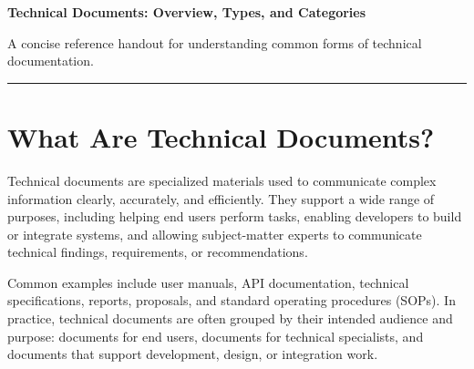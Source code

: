 \documentclass[11pt]{article}
\begin{document}
{\Large\bfseries\color{titlecolor} Technical Documents: Overview, Types, and Categories}\par
\vspace{0.35em}
{\normalsize A concise reference handout for understanding common forms of technical documentation.}\par
\vspace{0.8em}
\noindent\color{rulecolor}\rule{\textwidth}{1pt}

\section{What Are Technical Documents?}
Technical documents are specialized materials used to communicate complex information clearly, accurately, and efficiently. They support a wide range of purposes, including helping end users perform tasks, enabling developers to build or integrate systems, and allowing subject-matter experts to communicate technical findings, requirements, or recommendations.

Common examples include user manuals, API documentation, technical specifications, reports, proposals, and standard operating procedures (SOPs). In practice, technical documents are often grouped by their intended audience and purpose: documents for end users, documents for technical specialists, and documents that support development, design, or integration work.
\end{document}
